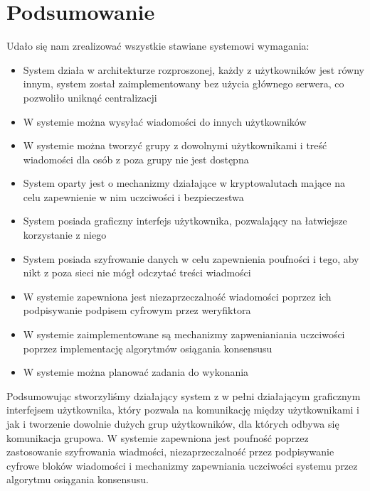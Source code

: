 \chapter{Podsumowanie}
Udało się nam zrealizować wszystkie stawiane systemowi wymagania:
\begin{itemize}
    \item System działa w architekturze rozproszonej, każdy z użytkowników jest równy innym, system został zaimplementowany bez użycia głównego serwera, co pozwoliło uniknąć centralizacji
    \item W systemie można wysyłać wiadomości do innych użytkowników
    \item W systemie można tworzyć grupy z dowolnymi użytkownikami i treść wiadomości dla osób z poza grupy nie jest dostępna
    \item System oparty jest o mechanizmy działające w kryptowalutach mające na celu zapewnienie w nim uczciwości i bezpieczestwa
    \item System posiada graficzny interfejs użytkownika, pozwalający na łatwiejsze korzystanie z niego
    \item System posiada szyfrowanie danych w celu zapewnienia poufności i tego, aby nikt z poza sieci nie mógł odczytać treści wiadmości
    \item W systemie zapewniona jest niezaprzeczalność wiadomości poprzez ich podpisywanie podpisem cyfrowym przez weryfiktora
    \item W systemie zaimplementowane są mechanizmy zapwenianiania uczciwości poprzez implementację algorytmów osiągania konsensusu
    \item W systemie można planować zadania do wykonania
\end{itemize}
\vspace{0.3\baselineskip}
Podsumowując stworzyliśmy działający system z w pełni działającym graficznym interfejsem użytkownika, który pozwala na komunikację między użytkownikami i jak i tworzenie dowolnie dużych grup użytkowników, dla których odbywa się komunikacja grupowa. W systemie zapewniona jest poufność poprzez zastosowanie szyfrowania wiadmości, niezaprzeczalność przez podpisywanie cyfrowe bloków wiadomości i mechanizmy zapewniania uczciwości systemu przez algorytmu osiągania konsensusu.